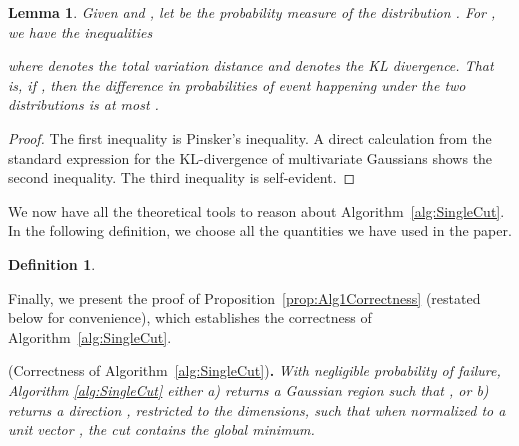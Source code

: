 \documentclass[11pt,letter]{article}
\newcounter{nTheorems}
\numberwithin{nTheorems}{section}
\newtheorem{lemma}[nTheorems]{Lemma}
\newtheorem{definition}[nTheorems]{Definition}
\begin{document}
\begin{lemma}
\label{lem:Pinsker}
Given  and , let  be the probability measure of the distribution .
For , we have the inequalities

where  denotes the \emph{total variation distance} and  denotes the \emph{KL divergence}.
That is, if , then the difference in probabilities of event  happening under the two distributions is at most .
\end{lemma}

\begin{proof}
The first inequality is Pinsker's inequality.
A direct calculation from the standard expression for the KL-divergence of multivariate Gaussians shows the second inequality.
The third inequality is self-evident.
\end{proof}

We now have all the theoretical tools to reason about Algorithm~\ref{alg:SingleCut}.
In the following definition, we choose all the quantities we have used in the paper.
\begin{definition}\label{def:Parameters}

\end{definition}

Finally, we present the proof of Proposition~\ref{prop:Alg1Correctness} (restated below for convenience), which establishes the correctness of Algorithm~\ref{alg:SingleCut}.

\medskip{} (Correctness of Algorithm~\ref{alg:SingleCut}){\bf .} \emph{With negligible probability of failure, Algorithm \ref{alg:SingleCut} either a) returns a Gaussian region  such that , or b) returns a direction , restricted to the  dimensions, such that when normalized to a unit vector , the cut  contains the global minimum.
}
\end{document}

